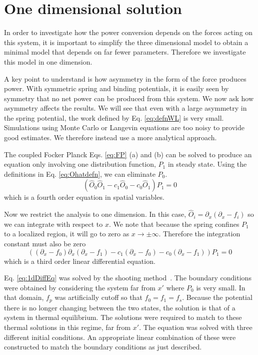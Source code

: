\documentclass[11pt]{ucthesis}
\def\Ohat{\hat O}
\def\px{\partial_x}
\begin{document}
\section{One dimensional solution}
\label{sec:1Dsol}
In order to investigate how the power conversion depends on the forces acting on
this system, it is important to simplify the three dimensional model to obtain
a minimal model that depends on far fewer parameters. Therefore we investigate
this model in one dimension.

A key point to understand is how asymmetry in the form of the force produces
power. With symmetric spring and binding potentials, it is easily seen by
symmetry that no net power can be produced from this system. We now ask how
asymmetry affects the results. We will see that even with a large asymmetry
in the spring potential, the work defined by Eq. \ref{eq:defnWL} is very small.
Simulations using Monte Carlo or Langevin equations are too noisy to provide
good estimates. We therefore instead use a more analytical approach.

The coupled Focker Planck Eqs. \ref{eq:FP} (a) and (b) can be solved to produce
an equation only involving one distribution function, $P_1$ in steady state.
Using the definitions in Eq. \ref{eq:Ohatdefn}, we can eliminate $P_0$.
\begin{equation}
(\Ohat_0\Ohat_1 - c_1 \Ohat_0 - c_0 \Ohat_1) P_1 = 0
\end{equation}
which is a fourth order equation in spatial variables.

Now we restrict the analysis to one dimension. In this case, $\Ohat_i = \px(\px-f_i)$
so we can integrate with respect to $x$. We note that because the spring
confines $P_1$ to a localized region, it will go to zero as
$x\rightarrow\pm\infty$. Therefore the integration constant must also be zero
\begin{equation}
\label{eq:1dDiffEq}
((\px-f_0)\px(\px-f_1) - c_1 (\px-f_0) - c_0 (\px-f_1)) P_1 = 0
\end{equation}
which is a third order linear differential equation.

Eq. \ref{eq:1dDiffEq} was solved by the shooting method~\cite{ShootingMethod}.
The boundary conditions were obtained by considering the system far from $x'$ where $P_0$ is very small. In that
domain, $f_p$ was artificially cutoff so that $f_0=f_1=f_s$. Because the
potential there is no longer changing between the two states, the solution is
that of a system in thermal equilibrium. The solutions were required to match to
these thermal solutions in this regime, far from $x'$.
The equation was solved with three different initial conditions. An appropriate
linear combination of these were constructed to match the boundary conditions as
just described.
\end{document}
